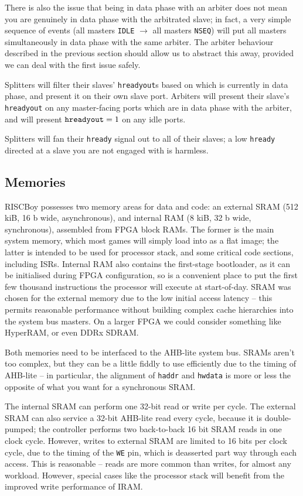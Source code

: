 There is also the issue that being in data phase with an arbiter does not mean you are genuinely in data phase with the arbitrated slave; in fact, a very simple sequence of events (all masters {\tt IDLE} $\to$ all masters {\tt NSEQ}) will put all masters simultaneously in data phase with the same arbiter. The arbiter behaviour described in the previous section should allow us to abstract this away, provided we can deal with the first issue safely.

Splitters will filter their slaves' {\tt hreadyout}s based on which is currently in data phase, and present it on their own slave port. Arbiters will present their slave's {\tt hreadyout} on any master-facing ports which are in data phase with the arbiter, and will present ${\tt hreadyout} = 1$ on any idle ports.

Splitters will fan their {\tt hready} signal out to all of their slaves; a low {\tt hready} directed at a slave you are not engaged with is harmless.

\subsection{Memories}

RISCBoy possesses two memory areas for data and code: an external SRAM (512 kiB, 16 b wide, asynchronous), and internal RAM (8 kiB, 32 b wide, synchronous), assembled from FPGA block RAMs. The former is the main system memory, which most games will simply load into as a flat image; the latter is intended to be used for processor stack, and some critical code sections, including ISRs. Internal RAM also contains the first-stage bootloader, as it can be initialised during FPGA configuration, so is a convenient place to put the first few thousand instructions the processor will execute at start-of-day. SRAM was chosen for the external memory due to the low initial access latency -- this permits reasonable performance without building complex cache hierarchies into the system bus masters. On a larger FPGA we could consider something like HyperRAM, or even DDRx SDRAM.

Both memories need to be interfaced to the AHB-lite system bus. SRAMs aren't too complex, but they can be a little fiddly to use efficiently due to the timing of AHB-lite -- in particular, the alignment of {\tt haddr} and {\tt hwdata} is more or less the opposite of what you want for a synchronous SRAM.

The internal SRAM can perform one 32-bit read or write per cycle. The external SRAM can also service a 32-bit AHB-lite read every cycle, because it is double-pumped; the controller performs two back-to-back 16 bit SRAM reads in one clock cycle. However, writes to external SRAM are limited to 16 bits per clock cycle, due to the timing of the {\tt WE} pin, which is deasserted part way through each access. This is reasonable -- reads are more common than writes, for almost any workload. However, special cases like the processor stack will benefit from the improved write performance of IRAM.

